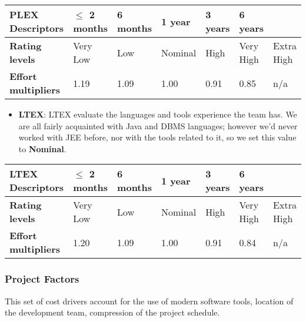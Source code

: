 		\begin{center}
			\begin{tabular}{ | C{2cm} | C{2cm} | C{2cm} | C{2cm} | C{2cm} | C{2cm} | C{2cm} | }
				\hline
				\textbf{PLEX Descriptors} & $\leq$ 2 months & 6 months & 1 year & 3 years & 6 years & \\ \hline
			
				\textbf{Rating levels} & Very Low & Low & Nominal & High & Very High & Extra High\\ \hline
			
				\textbf{Effort multipliers} & 1.19 & 1.09 & 1.00 & 0.91 & 0.85 & n/a\\ \hline
			\end{tabular}
		\end{center}
		
		
		
		
		\begin{itemize}
			\item \textbf{LTEX}: LTEX evaluate the languages and tools experience the team has. We are all fairly acquainted with Java and DBMS languages; however we'd never worked with JEE before, nor with the tools related to it, so we set this value to \textbf{Nominal}.
		\end{itemize}
		
		\begin{center}
			\begin{tabular}{ | C{2cm} | C{2cm} | C{2cm} | C{2cm} | C{2cm} | C{2cm} | C{2cm} | }
				\hline
				\textbf{LTEX Descriptors} & $\leq$ 2 months & 6 months & 1 year & 3 years & 6 years & \\ \hline
			
				\textbf{Rating levels} & Very Low & Low & Nominal & High & Very High & Extra High\\ \hline
			
				\textbf{Effort multipliers} & 1.20 & 1.09 & 1.00 & 0.91 & 0.84 & n/a\\ \hline
			\end{tabular}
		\end{center}
		
		
		
		
	\subsubsection*{Project Factors}
	This set of cost drivers account for the use of modern software tools, location of the development team, compression of the project schedule. 
	

